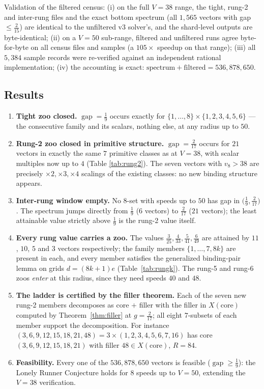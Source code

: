 \documentclass[11pt,a4paper]{article}
\theoremstyle{plain}
\theoremstyle{definition}
\theoremstyle{remark}
\newcommand{\gap}{\operatorname{gap}}
\begin{document}
Validation of the filtered census: (i) on the full $V = 38$ range, the
tight, rung-2 and inter-rung files and the exact bottom spectrum (all
$1{,}565$ vectors with gap $\le \tfrac{2}{15}$) are identical to the
unfiltered v3 solver's, and the shard-level outputs are byte-identical;
(ii) on a $V = 50$ sub-range, filtered and unfiltered runs agree
byte-for-byte on all census files and samples (a $105\times$ speedup on
that range); (iii) all $5{,}384$ sample records were re-verified against an
independent rational implementation; (iv) the accounting is exact:
$\text{spectrum} + \text{filtered} = 536{,}878{,}650$.

\subsection{Results}

\begin{enumerate}[label=\textbf{R\arabic*.}, leftmargin=*]
\item \textbf{Tight zoo closed.} $\gap = \tfrac19$ occurs exactly for
$\{1, \dots, 8\} \times \{1, 2, 3, 4, 5, 6\}$ --- the consecutive family and
its scalars, nothing else, at any radius up to $50$.
\item \textbf{Rung-2 zoo closed in primitive structure.} $\gap =
\tfrac{2}{17}$ occurs for $21$ vectors in exactly the same $7$ primitive
classes as at $V = 38$, with scalar multiples now up to $4$ (Table
\ref{tab:rung2}). The seven vectors with $v_8 > 38$ are precisely
$\times 2, \times 3, \times 4$ scalings of the existing classes: no new
binding structure appears.
\item \textbf{Inter-rung window empty.} No $8$-set with speeds up to $50$
has gap in $\bigl(\tfrac19, \tfrac{2}{17}\bigr)$. The spectrum jumps
directly from $\tfrac19$ ($6$ vectors) to $\tfrac{2}{17}$ ($21$ vectors);
the least attainable value strictly above $\tfrac19$ is the rung-2 value
itself.
\item \textbf{Every rung value carries a zoo.} The values
$\tfrac{3}{25}, \tfrac{4}{33}, \tfrac{5}{41}, \tfrac{6}{49}$ are attained by
$11$, $10$, $5$ and $3$ vectors respectively; the family members
$\{1, \dots, 7, 8k\}$ are present in each, and every member satisfies the
generalized binding-pair lemma on grids $d = (8k+1)e$ (Table~\ref{tab:rungk}).
The rung-5 and rung-6 zoos \emph{enter} at this radius, since they need
speeds $40$ and $48$.
\item \textbf{The ladder is certified by the filler theorem.} Each of the
seven new rung-2 members decomposes as core $+$ filler with the filler in
$X(\text{core})$ computed by Theorem~\ref{thm:filler} at $g =
\tfrac{2}{17}$; all eight $7$-subsets of each member support the
decomposition. For instance $(3, 6, 9, 12, 15, 18, 21, 48) = 3 \times
(1, 2, 3, 4, 5, 6, 7, 16)$ has core $(3, 6, 9, 12, 15, 18, 21)$ with
filler $48 \in X(\text{core})$, $R = 84$.
\item \textbf{Feasibility.} Every one of the $536{,}878{,}650$ vectors is
feasible ($\gap \ge \tfrac19$): the Lonely Runner Conjecture holds for
$8$ speeds up to $V = 50$, extending the $V = 38$ verification.
\end{enumerate}
\end{document}
